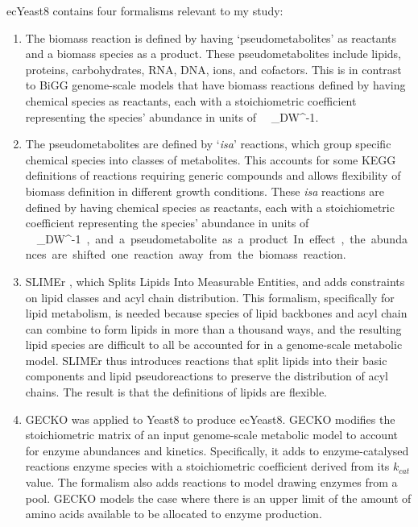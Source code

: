 ecYeast8 contains four formalisms relevant to my study:
\begin{enumerate}
  \item
        The biomass reaction is defined by having `pseudometabolites' as reactants and a biomass species as a product.
        These pseudometabolites include lipids, proteins, carbohydrates, RNA, DNA, ions, and cofactors.
        This is in contrast to BiGG genome-scale models that have biomass reactions defined by having chemical species as reactants, each with a stoichiometric coefficient representing the species' abundance in units of \SI{}{\milli\mol~\gram_{DW}^{-1}}.
  \item
        The pseudometabolites are defined by `\textit{isa}' reactions, which group specific chemical species into classes of metabolites.
        This accounts for some KEGG definitions of reactions requiring generic compounds and allows flexibility of biomass definition in different growth conditions.
        These \textit{isa} reactions are defined by having chemical species as reactants, each with a stoichiometric coefficient representing the species' abundance in units of \SI{}{\milli\mol~\gram_{DW}^{-1}}, and a pseudometabolite as a product.
        In effect, the abundances are shifted one reaction away from the biomass reaction.
  \item
        SLIMEr \parencite{sanchezSLIMErProbingFlexibility2019}, which Splits Lipids Into Measurable Entities, and adds constraints on lipid classes and acyl chain distribution.
        This formalism, specifically for lipid metabolism, is needed because species of lipid backbones and acyl chain can combine to form lipids in more than a thousand ways, and the resulting lipid species are difficult to all be accounted for in a genome-scale metabolic model.
        SLIMEr thus introduces reactions that split lipids into their basic components and lipid pseudoreactions to preserve the distribution of acyl chains.
        The result is that the definitions of lipids are flexible.
  \item
        GECKO was applied to Yeast8 to produce ecYeast8.  GECKO modifies the stoichiometric matrix of an input genome-scale metabolic model to account for enzyme abundances and kinetics.
        Specifically, it adds to enzyme-catalysed reactions enzyme species with a stoichiometric coefficient derived from its $k_{cat}$ value.
        The formalism also adds reactions to model drawing enzymes from a pool.  GECKO models the case where there is an upper limit of the amount of amino acids available to be allocated to enzyme production.
\end{enumerate}

